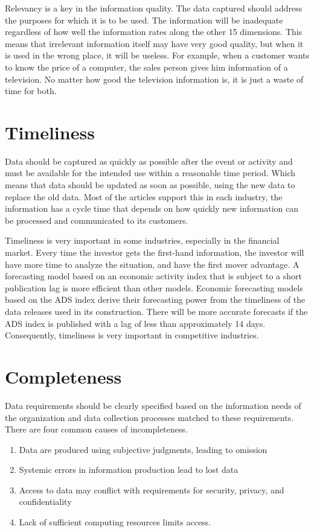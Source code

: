 Relevancy is a key in the information quality. The data captured should address the purposes for which it is to be used.
The information will be inadequate regardless of how well the information rates along the other 15 dimensions. 
This means that irrelevant information itself may have very good quality, but when it is used in the wrong place, 
it will be useless. For example, when a customer wants to know the price of a computer, 
the sales person gives him information of a television. No matter how good the television information is,
it is just a waste of time for both.

\section{Timeliness}

Data should be captured as quickly as possible after the event or activity and must be available for the intended use within a 
reasonable time period. Which means that data should be updated as soon as possible,
using the new data to replace the old data. Most of the articles support this in each industry, 
the information has a cycle time that depends on how quickly new information can be processed and communicated to its customers. 

Timeliness is very important in some industries, especially in the financial market.
Every time the investor gets the first-hand information, the investor will have more time to analyze the situation, 
and have the first mover advantage. A forecasting model based on an economic activity index that is subject to a short
publication lag is more efficient than other models. Economic forecasting models based on the ADS index derive their forecasting
power from the timeliness of the data releases used in its construction.
There will be more accurate forecasts if the ADS index is published with a lag of less than approximately 14 days.
Consequently, timeliness is very important in competitive industries. \cite{taylor} 

\section{Completeness}

Data requirements should be clearly specified based on the information needs of the organization 
and data collection processes matched to these requirements. There are four common causes of incompleteness. 
\begin{enumerate}
  \item Data are produced using subjective judgments, leading to omission
  \item Systemic errors in information production lead to lost data
  \item Access to data may conflict with requirements for security, privacy, and confidentiality
  \item Lack of sufficient computing resources limits access. \cite{wang} 
\end{enumerate}

